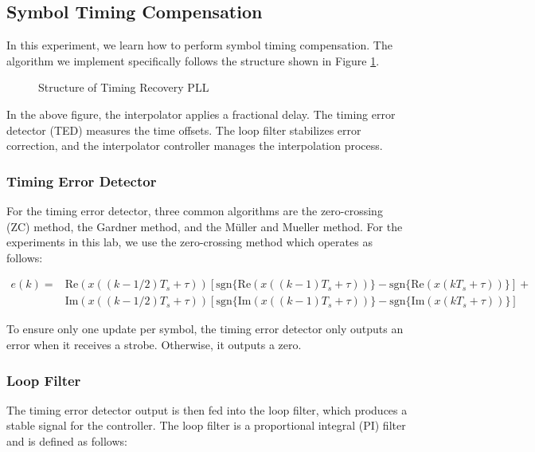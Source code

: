 \documentclass{article}
\begin{document}
\subsection{Symbol Timing Compensation}

In this experiment, we learn how to perform symbol timing compensation. The algorithm we implement specifically follows the structure shown in Figure \ref{fig::timing_recovery_block_diagram_1}.

\begin{figure}[H]
	\centerline{}
	\caption{Structure of Timing Recovery PLL}
	\label{fig::timing_recovery_block_diagram_1}
\end{figure}

\noindent In the above figure, the interpolator applies a fractional delay. The timing error detector (TED) measures the time offsets. The loop filter stabilizes error correction, and the interpolator controller manages the interpolation process.

\subsubsection{Timing Error Detector}
For the timing error detector, three common algorithms are the zero-crossing (ZC) method, the Gardner method, and the M\"{u}ller and Mueller method. For the experiments in this lab, we use the zero-crossing method which operates as follows:

\begin{align}
	e(k) = &\text{Re}(x((k-1/2)T_s + \tau))\left[\text{sgn}\{\text{Re}(x((k-1)T_s+\tau))\} - \text{sgn}\{\text{Re}(x(kT_s+\tau))\}\right] + \\
	&\text{Im}(x((k-1/2)T_s + \tau))\left[\text{sgn}\{\text{Im}(x((k-1)T_s+\tau))\} - \text{sgn}\{\text{Im}(x(kT_s+\tau))\}\right]
\end{align}

\noindent To ensure only one update per symbol, the timing error detector only outputs an error when it receives a strobe. Otherwise, it outputs a zero.

\subsubsection{Loop Filter}
The timing error detector output is then fed into the loop filter, which produces a stable signal for the controller. The loop filter is a proportional integral (PI) filter and is defined as follows:
\end{document}

